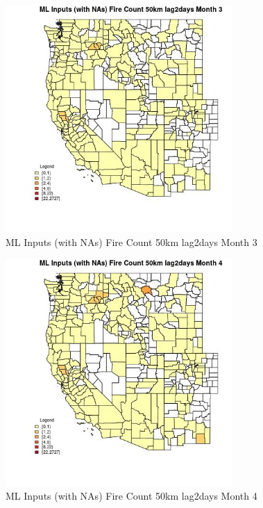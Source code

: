 \clearpage 

\begin{figure} 
\centering  
\includegraphics[width=0.77\textwidth]{Code_Outputs/Report_ML_input_PM25_Step4_part_f_de_duplicated_aves_prioritize_24hr_obswNAs_CountyFire_Count_50km_lag2daysmedianMonth3.jpg} 
\caption{\label{fig:Report_ML_input_PM25_Step4_part_f_de_duplicated_aves_prioritize_24hr_obswNAsCountyFire_Count_50km_lag2daysmedianMonth3}ML Inputs (with NAs) Fire Count 50km lag2days Month 3} 
\end{figure} 
 

\begin{figure} 
\centering  
\includegraphics[width=0.77\textwidth]{Code_Outputs/Report_ML_input_PM25_Step4_part_f_de_duplicated_aves_prioritize_24hr_obswNAs_CountyFire_Count_50km_lag2daysmedianMonth4.jpg} 
\caption{\label{fig:Report_ML_input_PM25_Step4_part_f_de_duplicated_aves_prioritize_24hr_obswNAsCountyFire_Count_50km_lag2daysmedianMonth4}ML Inputs (with NAs) Fire Count 50km lag2days Month 4} 
\end{figure} 
 

